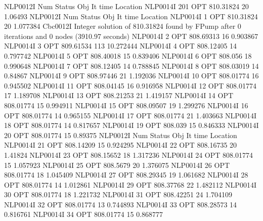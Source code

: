 NLP0012I 
              Num      Status      Obj             It       time                 Location
NLP0014I           201         OPT 810.31824       20 1.06493
NLP0012I 
              Num      Status      Obj             It       time                 Location
NLP0014I             1         OPT 810.31824       20 1.077384
Cbc0012I Integer solution of 810.31824 found by FPump after 0 iterations and 0 nodes (3910.97 seconds)
NLP0014I             2         OPT 808.69313       16 0.903867
NLP0014I             3         OPT 809.61534      113 10.272444
NLP0014I             4         OPT 808.12405       14 0.797742
NLP0014I             5         OPT 808.40018       15 0.839406
NLP0014I             6         OPT 808.056       18 0.990648
NLP0014I             7         OPT 808.12405       14 0.788845
NLP0014I             8         OPT 808.03019       14 0.84867
NLP0014I             9         OPT 808.97446       21 1.192036
NLP0014I            10         OPT 808.01774       16 0.945502
NLP0014I            11         OPT 808.04145       16 0.916958
NLP0014I            12         OPT 808.01774       17 1.189708
NLP0014I            13         OPT 808.21253       21 1.419157
NLP0014I            14         OPT 808.01774       15 0.994911
NLP0014I            15         OPT 808.09507       19 1.299276
NLP0014I            16         OPT 808.01774       14 0.965155
NLP0014I            17         OPT 808.01774       21 1.403663
NLP0014I            18         OPT 808.01774       14 0.817657
NLP0014I            19         OPT 808.039       15 0.846333
NLP0014I            20         OPT 808.01774       15 0.89375
NLP0012I 
              Num      Status      Obj             It       time                 Location
NLP0014I            21         OPT 808.14209       15 0.924295
NLP0014I            22         OPT 808.16735       20 1.41824
NLP0014I            23         OPT 808.15652       18 1.317236
NLP0014I            24         OPT 808.01774       15 1.057923
NLP0014I            25         OPT 808.5679       20 1.376075
NLP0014I            26         OPT 808.01774       18 1.045409
NLP0014I            27         OPT 808.29345       19 1.061682
NLP0014I            28         OPT 808.01774       14 1.012861
NLP0014I            29         OPT 808.37768       22 1.482112
NLP0014I            30         OPT 808.01774       18 1.221732
NLP0014I            31         OPT 808.42251       24 1.704109
NLP0014I            32         OPT 808.01774       13 0.744893
NLP0014I            33         OPT 808.28573       14 0.816761
NLP0014I            34         OPT 808.01774       15 0.868777
